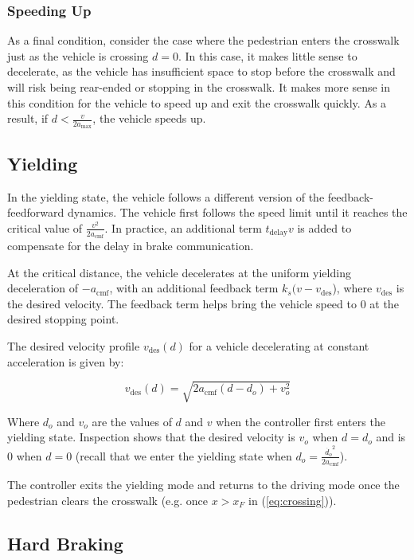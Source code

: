 \documentclass[letterpaper, 10 pt, conference]{ieeeconf}  %
\begin{document}
\subsubsection{Speeding Up}

As a final condition, consider the case where the pedestrian enters the crosswalk just as the vehicle is crossing $d = 0$. In this case, it makes little sense to decelerate, as the vehicle has insufficient space to stop before the crosswalk and will risk being rear-ended or stopping in the crosswalk. It makes more sense in this condition for the vehicle to speed up and exit the crosswalk quickly. As a result, if $d < \frac{v}{2a_\mathrm{max}}$, the vehicle speeds up. 

\subsection{Yielding}

In the yielding state, the vehicle follows a different version of the feedback-feedforward dynamics. The vehicle first follows the speed limit until it reaches the critical value of $\frac{v^2}{2a_\mathrm{cmf}}$. In practice, an additional term $t_\mathrm{delay}v$ is added to compensate for the delay in brake communication. 

At the critical distance, the vehicle decelerates at the uniform yielding deceleration of $-a_\mathrm{cmf}$, with an additional feedback term $k_s(v - v_\mathrm{des}$), where $v_\mathrm{des}$ is the desired velocity. The feedback term helps bring the vehicle speed to 0 at the desired stopping point. 

The desired velocity profile $v_\mathrm{des}(d)$ for a vehicle decelerating at constant acceleration is given by: 

\begin{equation}
v_\mathrm{des}(d) = \sqrt{2a_\mathrm{cmf}(d-d_o) + v_o^2}
\end{equation}

Where $d_o$ and $v_o$ are the values of $d$ and $v$ when the controller first enters the yielding state. Inspection shows that the desired velocity is $v_o$ when $d = d_o$ and is 0 when $d = 0$ (recall that we enter the yielding state when $d_o = \frac{\dot{d_o}^2}{2a_\mathrm{cmf}}$). 

The controller exits the yielding mode and returns to the driving mode once the pedestrian clears the crosswalk (e.g. once $x > x_F$ in (\ref{eq:crossing})). 

\subsection{Hard Braking}
\end{document}
